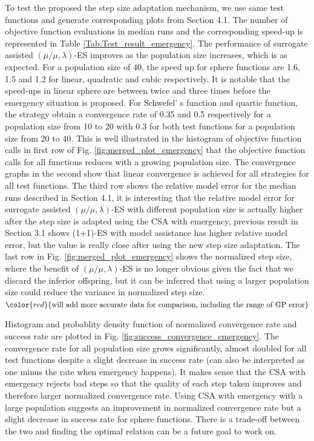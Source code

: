 To test the proposed the step size adaptation mechanism, we use same test functions and generate corresponding plots from Section 4.1. The number of objective function evaluations in median runs and the corresponding speed-up is represented in Table \ref{Tab:Test_result_emergency}. The performance of surrogate assisted $(\mu/\mu,\lambda)$-ES improves as the population size increases, which is as expected. For a population size of $40$, the speed up for sphere functions are 1.6, 1.5 and 1.2 for linear, quadratic and cubic respectively. It is notable that the speed-ups in linear sphere are between twice and three times before the emergency situation is proposed. For Schwefel' s function and quartic function, the strategy obtain a convergence rate of 0.35 and 0.5 respectively for a population size from 10 to 20 with 0.3 for both test functions for a population size from 20 to 40. This is well illustrated in the histogram of objective function calls in first row of Fig. \ref{fig:merged_plot_emergency} that the objective function calls for all functions reduces with a growing population size. The convergence graphs  in the second show that linear convergence is achieved for all strategies for all test functions. The third row shows the relative model error for the median runs described in Section 4.1, it is interesting that the relative model error for surrogate assisted $(\mu/\mu,\lambda)$-ES with different population size is actually higher after the step size is adapted using the CSA with emergency, previous result in Section 3.1 shows (1+1)-ES with model assistance has higher relative model error, but the value is really close after using the new step size adaptation. The last row in Fig. \ref{fig:merged_plot_emergency} shows the normalized step size, where the benefit of $(\mu/\mu,\lambda)$-ES is no longer obvious given the fact that we discard the inferior offspring, but it can be inferred that using a larger population size could reduce the variance in normalized step size.
$\color{red}{\text{will add more accurate data for comparison, including the range of GP error}}$    

Histogram and probablity density function of normalized convergence rate and success rate are plotted in Fig. \ref{fig:success_convergence_emergency}. The convergence rate for all population size grows significantly, almost doubled for all test functions despite a slight decrease in success rate (can also be interpreted as one minus the rate when emergency happens). It makes sense that the CSA with emergency rejects bad steps so that the quality of each step taken improves and therefore larger normalized convergence rate. Using CSA with emergency with a large population suggests an improvement in normalized convergence rate but a slight decrease in success rate for sphere functions. There is a trade-off between the two and finding the optimal relation can be a future goal to work on.



